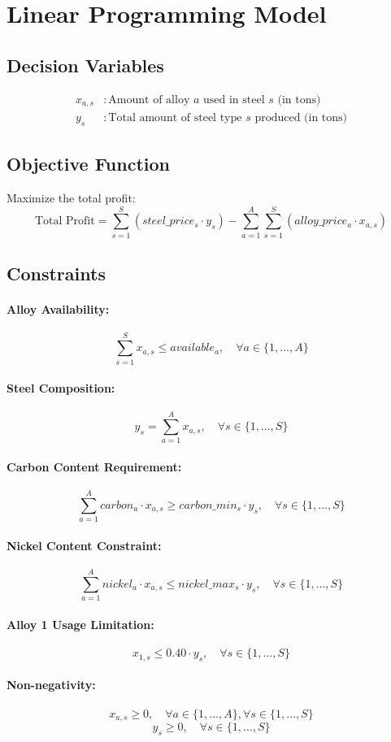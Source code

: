 \documentclass{article}
\begin{document}
\section*{Linear Programming Model}

\subsection*{Decision Variables}
\begin{align*}
x_{a,s} & : \text{Amount of alloy } a \text{ used in steel } s \text{ (in tons)} \\
y_s & : \text{Total amount of steel type } s \text{ produced (in tons)}
\end{align*}

\subsection*{Objective Function}
Maximize the total profit:
\[
\text{Total Profit} = \sum_{s=1}^{S} \left( steel\_price_{s} \cdot y_s \right) - \sum_{a=1}^{A} \sum_{s=1}^{S} \left( alloy\_price_{a} \cdot x_{a,s} \right)
\]

\subsection*{Constraints}

\paragraph{Alloy Availability:}
\[
\sum_{s=1}^{S} x_{a,s} \leq available_{a}, \quad \forall a \in \{1, \ldots, A\}
\]

\paragraph{Steel Composition:}
\[
y_s = \sum_{a=1}^{A} x_{a,s}, \quad \forall s \in \{1, \ldots, S\}
\]

\paragraph{Carbon Content Requirement:}
\[
\sum_{a=1}^{A} carbon_{a} \cdot x_{a,s} \geq carbon\_min_{s} \cdot y_s, \quad \forall s \in \{1, \ldots, S\}
\]

\paragraph{Nickel Content Constraint:}
\[
\sum_{a=1}^{A} nickel_{a} \cdot x_{a,s} \leq nickel\_max_{s} \cdot y_s, \quad \forall s \in \{1, \ldots, S\}
\]

\paragraph{Alloy 1 Usage Limitation:}
\[
x_{1,s} \leq 0.40 \cdot y_s, \quad \forall s \in \{1, \ldots, S\}
\]

\paragraph{Non-negativity:}
\[
x_{a,s} \geq 0, \quad \forall a \in \{1, \ldots, A\}, \forall s \in \{1, \ldots, S\}
\]
\[
y_s \geq 0, \quad \forall s \in \{1, \ldots, S\}
\]
\end{document}
